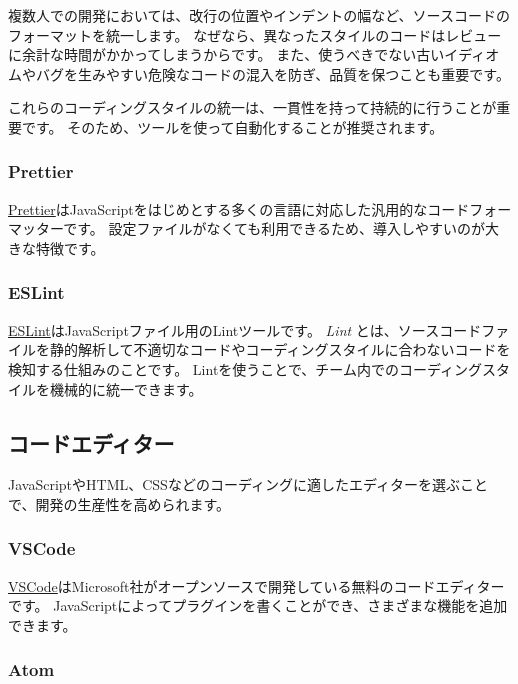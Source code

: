 複数人での開発においては、改行の位置やインデントの幅など、ソースコードのフォーマットを統一します。
なぜなら、異なったスタイルのコードはレビューに余計な時間がかかってしまうからです。
また、使うべきでない古いイディオムやバグを生みやすい危険なコードの混入を防ぎ、品質を保つことも重要です。

これらのコーディングスタイルの統一は、一貫性を持って持続的に行うことが重要です。
そのため、ツールを使って自動化することが推奨されます。

\hypertarget{prettier}{%
\subsubsection{Prettier}\label{prettier}}

\href{https://prettier.io/}{Prettier}はJavaScriptをはじめとする多くの言語に対応した汎用的なコードフォーマッターです。
設定ファイルがなくても利用できるため、導入しやすいのが大きな特徴です。

\hypertarget{eslint}{%
\subsubsection{ESLint}\label{eslint}}

\href{https://eslint.org/}{ESLint}はJavaScriptファイル用のLintツールです。
\emph{Lint}
とは、ソースコードファイルを静的解析して不適切なコードやコーディングスタイルに合わないコードを検知する仕組みのことです。
Lintを使うことで、チーム内でのコーディングスタイルを機械的に統一できます。

\hypertarget{code-editor}{%
\subsection{コードエディター}\label{code-editor}}

JavaScriptやHTML、CSSなどのコーディングに適したエディターを選ぶことで、開発の生産性を高められます。

\hypertarget{vscode}{%
\subsubsection{VSCode}\label{vscode}}

\href{https://code.visualstudio.com/}{VSCode}はMicrosoft社がオープンソースで開発している無料のコードエディターです。
JavaScriptによってプラグインを書くことができ、さまざまな機能を追加できます。

\hypertarget{atom}{%
\subsubsection{Atom}\label{atom}}

